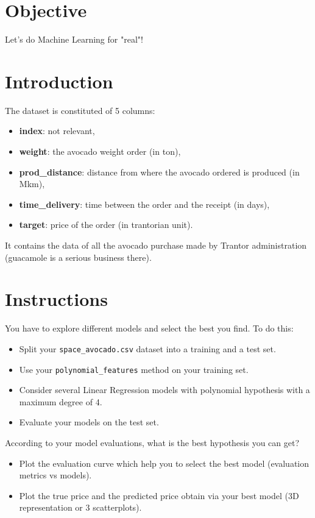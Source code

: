 \documentclass{42-en}
\begin{document}
\section*{Objective}
Let's do Machine Learning for "real"!

\section*{Introduction}
The dataset is constituted of 5 columns:
\begin{itemize}
  \item \textbf{index}: not relevant,
  \item \textbf{weight}: the avocado weight order (in ton),
  \item \textbf{prod\_distance}: distance from where the avocado ordered is produced (in Mkm),
  \item \textbf{time\_delivery}: time between the order and the receipt (in days),
  \item \textbf{target}: price of the order (in trantorian unit).
\end{itemize}
It contains the data of all the avocado purchase made by Trantor administration (guacamole is a serious business there).

\section*{Instructions}
You have to explore different models and select the best you find.
To do this:
\begin{itemize}
  \item Split your \texttt{space\_avocado.csv} dataset into a training and a test set.
  \item Use your \texttt{polynomial\_features} method on your training set.
  \item Consider several Linear Regression models with polynomial hypothesis with a maximum degree of 4.
  \item Evaluate your models on the test set.
\end{itemize}

According to your model evaluations, what is the best hypothesis you can get?
\begin{itemize}
  \item Plot the evaluation curve which help you to select the best model (evaluation metrics vs models).
  \item Plot the true price and the predicted price obtain via your best model (3D representation or 3 scatterplots).
\end{itemize}
\end{document}
